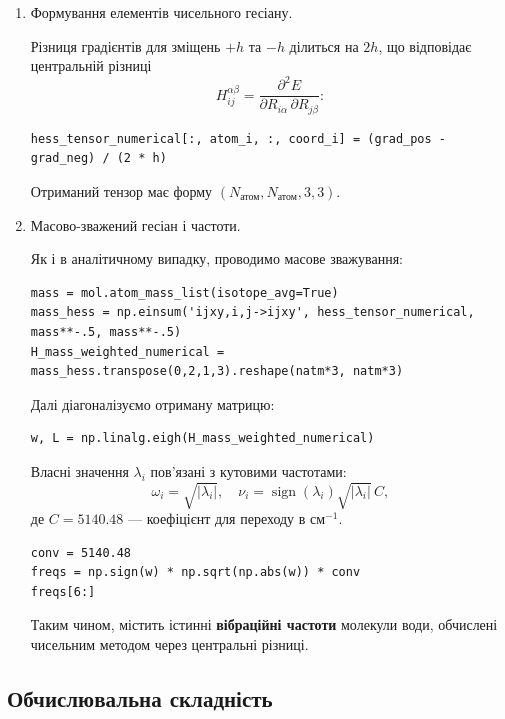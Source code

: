 \begin{enumerate}
\item Формування елементів чисельного гесіану.

Різниця градієнтів для зміщень $+h$ та $-h$ ділиться на $2h$, що відповідає центральній різниці
\[
H_{ij}^{\alpha\beta} = \frac{\partial^2 E}{\partial R_{i\alpha}\, \partial R_{j\beta}}:
\]

\begin{verbatim}
hess_tensor_numerical[:, atom_i, :, coord_i] = (grad_pos - grad_neg) / (2 * h)
\end{verbatim}

Отриманий тензор має форму \((N_\text{атом}, N_\text{атом}, 3, 3)\).

\item Масово-зважений гесіан і частоти.

Як і в аналітичному випадку, проводимо масове зважування:

\begin{verbatim}
mass = mol.atom_mass_list(isotope_avg=True)
mass_hess = np.einsum('ijxy,i,j->ijxy', hess_tensor_numerical, mass**-.5, mass**-.5)
H_mass_weighted_numerical = mass_hess.transpose(0,2,1,3).reshape(natm*3, natm*3)
\end{verbatim}

Далі діагоналізуємо отриману матрицю:

\begin{verbatim}
w, L = np.linalg.eigh(H_mass_weighted_numerical)
\end{verbatim}

Власні значення \(\lambda_i\) пов’язані з кутовими частотами:
\[
    \omega_i = \sqrt{|\lambda_i|}, \quad
    \nu_i = \operatorname{sign}(\lambda_i)\sqrt{|\lambda_i|}\, C,
\]
де \(C = 5140.48\) — коефіцієнт для переходу в см\(^{-1}\).

\begin{verbatim}
conv = 5140.48
freqs = np.sign(w) * np.sqrt(np.abs(w)) * conv
freqs[6:]
\end{verbatim}

Таким чином,  містить істинні \textbf{вібраційні частоти} молекули води,
обчислені чисельним методом через центральні різниці.


\end{enumerate}


\subsection{Обчислювальна складність}


